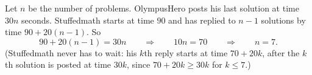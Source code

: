 Let $n$ be the number of problems. OlympusHero posts his last solution at time $30n$ seconds. Stuffedmath starts at time $90$ and has replied to $n-1$ solutions by time $90+20(n-1)$. So
\[90+20(n-1)=30n\qquad\Longrightarrow\qquad10n=70\qquad\Longrightarrow\qquad n=\boxed{7}.\]
(Stuffedmath never has to wait: his $k$th reply starts at time $70+20k$, after the $k$th solution is posted at time $30k$, since $70+20k\ge30k$ for $k\le7$.)
